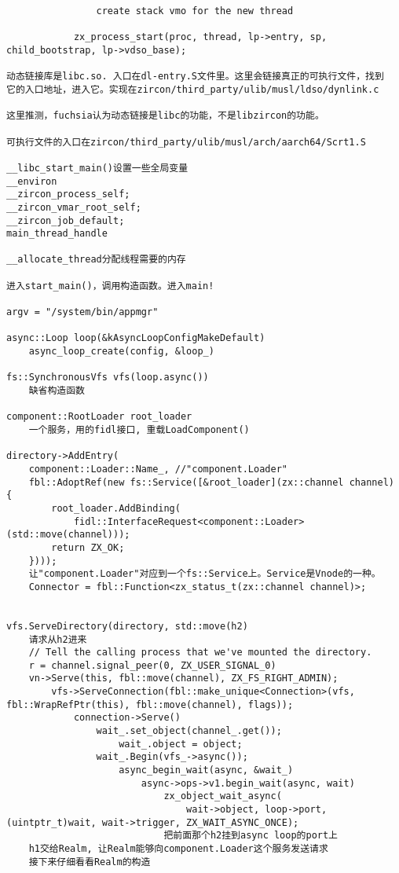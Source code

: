 \begin{verbatim}
                create stack vmo for the new thread

            zx_process_start(proc, thread, lp->entry, sp, child_bootstrap, lp->vdso_base);

动态链接库是libc.so. 入口在dl-entry.S文件里。这里会链接真正的可执行文件，找到
它的入口地址，进入它。实现在zircon/third_party/ulib/musl/ldso/dynlink.c

这里推测，fuchsia认为动态链接是libc的功能，不是libzircon的功能。

可执行文件的入口在zircon/third_party/ulib/musl/arch/aarch64/Scrt1.S

__libc_start_main()设置一些全局变量
__environ
__zircon_process_self;
__zircon_vmar_root_self;
__zircon_job_default;
main_thread_handle

__allocate_thread分配线程需要的内存

进入start_main()，调用构造函数。进入main!

argv = "/system/bin/appmgr"

async::Loop loop(&kAsyncLoopConfigMakeDefault)
    async_loop_create(config, &loop_)
    
fs::SynchronousVfs vfs(loop.async())
    缺省构造函数

component::RootLoader root_loader
    一个服务，用的fidl接口, 重载LoadComponent()

directory->AddEntry(
    component::Loader::Name_, //"component.Loader"
    fbl::AdoptRef(new fs::Service([&root_loader](zx::channel channel) {
        root_loader.AddBinding(
            fidl::InterfaceRequest<component::Loader>(std::move(channel)));
        return ZX_OK;
    })));
    让"component.Loader"对应到一个fs::Service上。Service是Vnode的一种。
    Connector = fbl::Function<zx_status_t(zx::channel channel)>;


vfs.ServeDirectory(directory, std::move(h2)
    请求从h2进来
    // Tell the calling process that we've mounted the directory.
    r = channel.signal_peer(0, ZX_USER_SIGNAL_0)
    vn->Serve(this, fbl::move(channel), ZX_FS_RIGHT_ADMIN);
        vfs->ServeConnection(fbl::make_unique<Connection>(vfs, fbl::WrapRefPtr(this), fbl::move(channel), flags));
            connection->Serve()
                wait_.set_object(channel_.get());
                    wait_.object = object;
                wait_.Begin(vfs_->async());
                    async_begin_wait(async, &wait_)
                        async->ops->v1.begin_wait(async, wait)
                            zx_object_wait_async(
                                wait->object, loop->port, (uintptr_t)wait, wait->trigger, ZX_WAIT_ASYNC_ONCE);
                            把前面那个h2挂到async loop的port上
    h1交给Realm, 让Realm能够向component.Loader这个服务发送请求
    接下来仔细看看Realm的构造


\end{verbatim}
